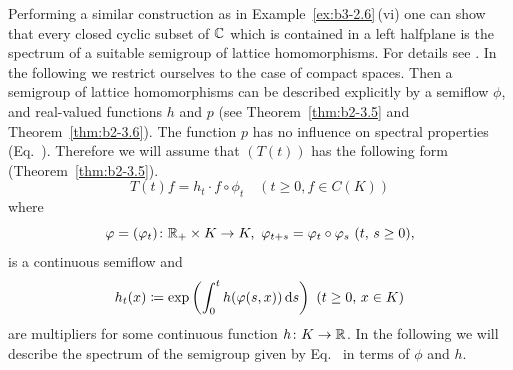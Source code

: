 Performing a similar construction as in Example~\ref{ex:b3-2.6}\,(vi) one can show that every closed cyclic subset of\/ $\mathbb{C}$  which is contained in a left halfplane is the spectrum of a suitable semigroup of lattice homomorphisms. 
For details see \textcite{derndingernagel:1979}. 
In the following we restrict ourselves to the case of compact spaces. 
Then a semigroup of lattice homomorphisms can be described explicitly by a semiflow $\phi$, and real-valued functions $h$ and $p$ (see Theorem~\ref{thm:b2-3.5} and Theorem~\ref{thm:b2-3.6}). 
The function $p$ has no influence on spectral properties (\cf Eq.~). 
Therefore we will assume that $(T(t))$ has the following form (\cf Theorem~\ref{thm:b2-3.5}). 
\begin{equation}\label{eq:b3-4.1}
	T(t)f = h_{t}\cdot f\circ\phi_{t} \quad (t \geq 0, f \in C(K)) 
\end{equation}
where 
\[
\phi = (\phi_{t}) \colon \R_{+} \times K \to K , \ \phi_{t+s}
=\phi_{t}\circ\phi_{s}  
\ (t,\,s \geq 0) , 
\]
is a continuous semiflow and 
\[
h_{t}(x) \coloneq \exp\left(\int_{0}^{t} h(\phi(s,x)) \ds\right)\ (t \geq 0,\, x \in K)
\]
are multipliers for some continuous function $h \colon K \to \mathbb{R}$.
In the following we will describe the spectrum of the semigroup given by Eq.~ in terms of\/ $\phi$ and $h$.

